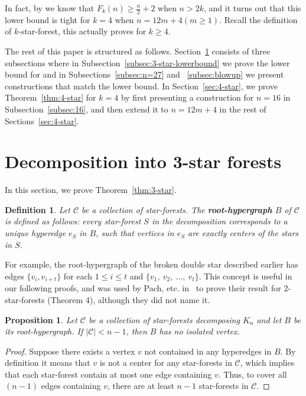 \documentclass{article}
\newtheorem{prop}[thm]{Proposition}
\newtheorem{defi}{Definition}
\newcommand{\C}{\mathcal{C}}
\begin{document}
In fact, by  we know that $F_k(n)\ge \frac{n}{2}+2$ when $n> 2k$, and it turns out that this lower bound is tight for $k=4$ when $n=12m+4 (m\ge 1)$. Recall the definition of $k$-star-forest, this actually proves  for $k\ge4$.

The rest of this paper is structured as follows. Section~\ref{sec:3-star} consists of three subsections where in Subsection~\ref{subsec:3-star-lowerbound} we prove the lower bound for  and in Subsections~\ref{subsec:n=27} and ~\ref{subsec:blowup} we present constructions that match the lower bound. In Section~\ref{sec:4-star}, we prove Theorem~\ref{thm:4-star} for $k=4$ by first presenting a construction for $n=16$ in Subsection~\ref{subsec:16}, and then extend it to $n=12m+4$ in the rest of Sections~\ref{sec:4-star}.

\section{Decomposition into 3-star forests}\label{sec:3-star}
In this section, we prove Theorem~\ref{thm:3-star}.

\begin{defi}
Let $\mathcal{C}$ be a collection of star-forests. The \textbf{root-hypergraph} $B$ of $\mathcal{C}$ is defined as follows: every star-forest $S$ in the decomposition corresponds to a unique hyperedge $e_S$ in $B$, such that vertices in $e_S$ are exactly centers of the stars in $S$.  
\end{defi}
For example, the root-hypergraph of the broken double star described earlier has edges $\{v_i,v_{i+t}\}$ for each $1\le i\le t$ and $\{v_1,~v_2,~\dots,~v_t\}$. This concept is useful in our following proofs, and was used by Pach, etc. in~\cite{pach2023decomposition} to prove their result for 2-star-forests (Theorem 4), although they did not name it. 

\begin{prop}\label{prop:no-iso}
Let $\C$ be a collection of star-forests decomposing $K_n$ and let $B$ be its root-hypergraph. If $|\C|<n-1$, then $B$ has no isolated vertex.
\end{prop}

\begin{proof}
Suppose there exists a vertex $v$ not contained in any hyperedges in $B$. By definition it means that $v$ is not a center for any star-forests in $\C$, which implies that each star-forest contain at most one edge containing $v$. Thus, to cover all $(n-1)$ edges containing $v$, there are at least $n-1$ star-forests in $\C$. 
\end{proof}
 
\end{document}
